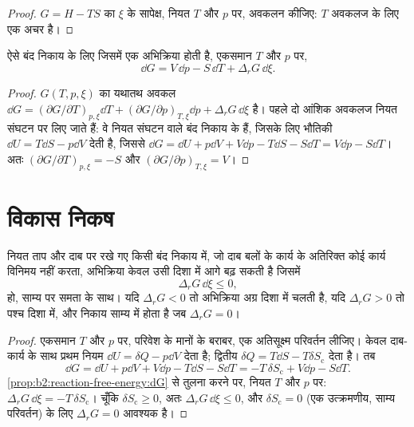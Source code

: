 \begin{proof}
$G = H - TS$ का $\xi$ के सापेक्ष, नियत $T$ और $p$ पर, अवकलन कीजिए: $T$
अवकलज के लिए एक अचर है।
\end{proof}

\begin{proposition}[अभिक्रियारत निकाय के लिए $G$ का अवकल]\label{prop:b2:reaction-free-energy:dG}
ऐसे बंद निकाय के लिए जिसमें एक अभिक्रिया होती है, एकसमान $T$ और
$p$ पर,
\[
  \dd G = V\,\dd p - S\,\dd T + \Delta_r G\,\dd\xi .
\]
\end{proposition}

\begin{proof}
$G(T, p, \xi)$ का यथातथ अवकल $\dd G = (\partial G/\partial
T)_{p,\xi}\dd T + (\partial G/\partial p)_{T,\xi}\dd p + \Delta_r G\,\dd\xi$ है।
पहले दो आंशिक अवकलज नियत संघटन पर लिए जाते हैं: वे
नियत संघटन वाले बंद निकाय के हैं, जिसके लिए भौतिकी
$\dd U = T\dd S - p\dd V$ देती है, जिससे $\dd G = \dd U + p\dd V + V\dd p - T\dd S
- S\dd T = V\dd p - S\dd T$। अतः $(\partial G/\partial T)_{p,\xi} = -S$
और $(\partial G/\partial p)_{T,\xi} = V$।
\end{proof}

\section{विकास निकष}

\begin{theorem}[विकास निकष]\label{thm:b2:reaction-free-energy:evolution}
नियत ताप और दाब पर रखे गए किसी बंद निकाय में, जो दाब बलों के कार्य के
अतिरिक्त कोई कार्य विनिमय नहीं करता, अभिक्रिया केवल उसी
दिशा में आगे बढ़ सकती है जिसमें
\[
  \Delta_r G\,\dd\xi \leq 0 ,
\]
हो, साम्य पर समता के साथ। यदि $\Delta_r G < 0$ तो अभिक्रिया अग्र
दिशा में चलती है, यदि $\Delta_r G > 0$ तो पश्च दिशा में, और निकाय
साम्य में होता है जब $\Delta_r G = 0$।
\end{theorem}

\begin{proof}
एकसमान $T$ और $p$ पर, परिवेश के मानों के बराबर, एक अतिसूक्ष्म परिवर्तन
लीजिए। केवल दाब-कार्य के साथ प्रथम नियम $\dd U = \delta Q
- p\dd V$ देता है; द्वितीय $\delta Q = T\dd S - T\delta S_{\text{c}}$ देता है। तब
\[
  \dd G = \dd U + p\dd V + V\dd p - T\dd S - S\dd T = -T\,\delta
  S_{\text{c}} + V\dd p - S\dd T .
\]
\cref{prop:b2:reaction-free-energy:dG} से तुलना करने पर, नियत $T$ और $p$ पर:
$\Delta_r G\,\dd\xi = -T\,\delta S_{\text{c}}$। चूँकि $\delta S_{\text{c}}
\geq 0$, अतः $\Delta_r G\,\dd\xi \leq 0$, और $\delta S_{\text{c}} = 0$ (एक
उत्क्रमणीय, साम्य परिवर्तन) के लिए $\Delta_r G = 0$ आवश्यक है।
\end{proof}


